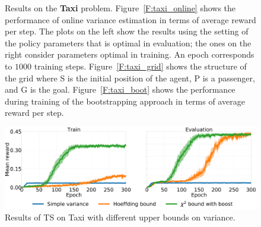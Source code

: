 \begin{figure}[t]
\begin{minipage}{.33\textwidth}
\begin{center}
\end{center}
\end{minipage}
\caption[Taxi results]{Results on the \textbf{Taxi} problem. Figure~\ref{F:taxi_online} shows the performance of online variance estimation in terms of average reward per step. The plots on the left show the results using the setting of the policy parameters that is optimal in evaluation; the ones on the right consider parameters optimal in training. An epoch corresponds to $1000$ training steps. Figure~\ref{F:taxi_grid} shows the structure of the grid where S is the initial position of the agent, P is a passenger, and G is the goal. Figure~\ref{F:taxi_boot} shows the performance during training of the bootstrapping approach in terms of average reward per step.}\label{F:taxi}
\end{figure}
\begin{figure}[t]
\begin{minipage}{\textwidth}
\begin{center}
  \includegraphics[scale=.05]{img/bounds.pdf}
\end{center}
\end{minipage}
\caption[Taxi with different upper bounds results - 1]{Results of TS on Taxi with different upper bounds on variance.}\label{F:bounds}
\end{figure}
